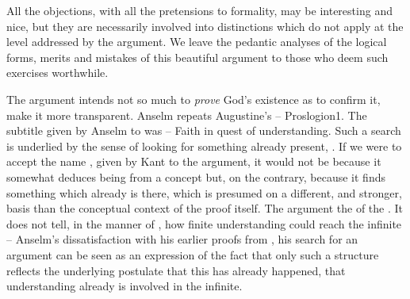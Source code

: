 All the objections, with all the pretensions to formality, may be interesting
and nice, but they are necessarily involved into  distinctions which
do not apply at the level addressed by the argument.
We leave the pedantic analyses of the logical forms, merits and mistakes of this
beautiful argument to those who deem such exercises worthwhile.

\pa The argument intends not so much to {\em prove} God's existence as to confirm
it, make it more transparent. Anselm
repeats Augustine's  -- \citet{For I do not seek to
  understand so that I may believe; but I believe so that I may
  understand.}{Proslogion}{1. The subtitle given by Anselm to 
  was  -- Faith in quest of understanding.}
Such a search is underlied by the sense of looking for something already
present, .
If we were to accept the name , given by Kant to the argument,
it would not be because it somewhat deduces being from a concept but, on the
contrary, because it finds something which already is there, which is presumed
on a different, and stronger, basis than the conceptual context of the proof
itself.
%
The argument  the  of the .  It does not
tell, in the manner of  , how finite understanding
could reach the infinite -- Anselm's dissatisfaction with his earlier proofs
from , his search for an  argument can be seen as
an expression of the fact that only such a structure reflects the underlying
postulate that this has already happened, that understanding already is involved
in the infinite.

